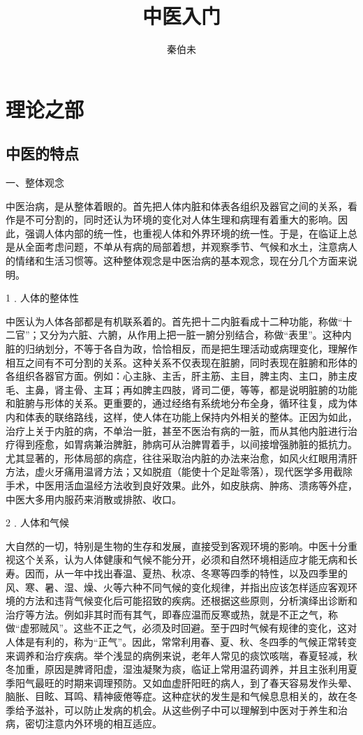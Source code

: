 \documentclass[12pt,UTF8]{ctexbook}
\title{\heiti\zihao{0} 中医入门}
\author{秦伯未}
\date{}
\begin{document}
\maketitle
\tableofcontents

\frontmatter

\mainmatter

\chapter{理论之部}

\section{中医的特点}

一、整体观念

中医治病，是从整体着眼的。首先把人体内脏和体表各组织及器官之间的关系，看作是不可分割的，同时还认为环境的变化对人体生理和病理有着重大的影响。因此，强调人体内部的统一性，也重视人体和外界环境的统一性。于是，在临证上总是从全面考虑问题，不单从有病的局部着想，并观察季节、气候和水土，注意病人的情绪和生活习惯等。这种整体观念是中医治病的基本观念，现在分几个方面来说明。

1﹒人体的整体性

中医认为人体各部都是有机联系着的。首先把十二内脏看成十二种功能，称做“十二官”；又分为六脏、六腑，从作用上把一脏一腑分别结合，称做“表里”。这种内脏的归纳划分，不等于各自为政，恰恰相反，而是把生理活动或病理变化，理解作相互之间有不可分割的关系。这种关系不仅表现在脏腑，同时表现在脏腑和形体的各组织各器官方面。例如：心主脉、主舌，肝主筋、主目，脾主肉、主口，肺主皮毛、主鼻，肾主骨、主耳；再如脾主四肢，肾司二便，等等，都是说明脏腑的功能和脏腑与形体的关系。更重要的，通过经络有系统地分布全身，循环往复，成为体内和体表的联络路线，这样，使人体在功能上保持内外相关的整体。正因为如此，治疗上关于内脏的病，不单治一脏，甚至不医治有病的一脏，而从其他内脏进行治疗得到痊愈，如胃病兼治脾脏，肺病可从治脾胃着手，以间接增强肺脏的抵抗力。尤其显著的，形体局部的病症，往往采取治内脏的办法来治愈，如风火红眼用清肝方法，虚火牙痛用温肾方法；又如脱疽（能使十个足趾零落），现代医学多用截除手术，中医用活血温经方法收到良好效果。此外，如皮肤病、肿疡、溃疡等外症，中医大多用内服药来消散或排脓、收口。

2﹒人体和气候

大自然的一切，特别是生物的生存和发展，直接受到客观环境的影响。中医十分重视这个关系，认为人体健康和气候不能分开，必须和自然环境相适应才能无病和长寿。因而，从一年中找出春温、夏热、秋凉、冬寒等四季的特性，以及四季里的风、寒、暑、湿、燥、火等六种不同气候的变化规律，并指出应该怎样适应客观环境的方法和违背气候变化后可能招致的疾病。还根据这些原则，分析演绎出诊断和治疗等方法。例如非其时而有其气，即春应温而反寒或热，就是不正之气，称做“虚邪贼风”。这些不正之气，必须及时回避。至于四时气候有规律的变化，这对人体是有利的，称为“正气”。因此，常常利用春、夏、秋、冬四季的气候正常转变来调养和治疗疾病。举个浅显的病例来说，老年人常见的痰饮咳喘，春夏轻减，秋冬加重，原因是脾肾阳虚，湿浊凝聚为痰，临证上常用温药调养，并且主张利用夏季阳气最旺的时期来调理预防。又如血虚肝阳旺的病人，到了春天容易发作头晕、脑胀、目眩、耳鸣、精神疲倦等症。这种症状的发生是和气候息息相关的，故在冬季给予滋补，可以防止发病的机会。从这些例子中可以理解到中医对于养生和治病，密切注意内外环境的相互适应。
\end{document}
